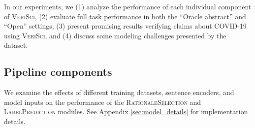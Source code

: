 \documentclass[11pt,a4paper]{article}
\newcommand{\sysname}{\textsc{VeriSci}\xspace}
\newcommand{\componenttwo}{\textsc{RationaleSelection}\xspace}
\newcommand{\componentthree}{\textsc{LabelPrediction}\xspace}
\begin{document}
In our experiments, we (1) analyze the performance of each individual component of \sysname, (2) evaluate full task performance in both the ``Oracle abstract'' and ``Open'' settings, (3) present promising results verifying claims about COVID-19 using \sysname, and (4) discuss some modeling challenges presented by the dataset.









\subsection{Pipeline components} \label{sec:pipeline_components}
We examine the effects of different training datasets, sentence encoders, and model inputs on the performance of the \componenttwo and \componentthree modules. See Appendix \ref{sec:model_details} for implementation details.
\end{document}
